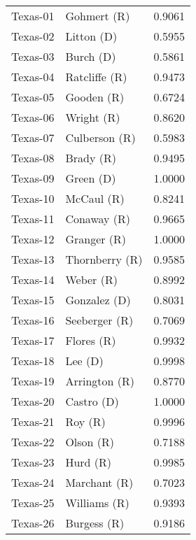 \begin{longtable}{llr}
          Texas-01 &          Gohmert (R) &       0.9061 \\
          Texas-02 &           Litton (D) &       0.5955 \\
          Texas-03 &            Burch (D) &       0.5861 \\
          Texas-04 &        Ratcliffe (R) &       0.9473 \\
          Texas-05 &           Gooden (R) &       0.6724 \\
          Texas-06 &           Wright (R) &       0.8620 \\
          Texas-07 &        Culberson (R) &       0.5983 \\
          Texas-08 &            Brady (R) &       0.9495 \\
          Texas-09 &            Green (D) &       1.0000 \\
          Texas-10 &           McCaul (R) &       0.8241 \\
          Texas-11 &          Conaway (R) &       0.9665 \\
          Texas-12 &          Granger (R) &       1.0000 \\
          Texas-13 &       Thornberry (R) &       0.9585 \\
          Texas-14 &            Weber (R) &       0.8992 \\
          Texas-15 &         Gonzalez (D) &       0.8031 \\
          Texas-16 &        Seeberger (R) &       0.7069 \\
          Texas-17 &           Flores (R) &       0.9932 \\
          Texas-18 &              Lee (D) &       0.9998 \\
          Texas-19 &        Arrington (R) &       0.8770 \\
          Texas-20 &           Castro (D) &       1.0000 \\
          Texas-21 &              Roy (R) &       0.9996 \\
          Texas-22 &            Olson (R) &       0.7188 \\
          Texas-23 &             Hurd (R) &       0.9985 \\
          Texas-24 &         Marchant (R) &       0.7023 \\
          Texas-25 &         Williams (R) &       0.9393 \\
          Texas-26 &          Burgess (R) &       0.9186 \\

\end{longtable}
